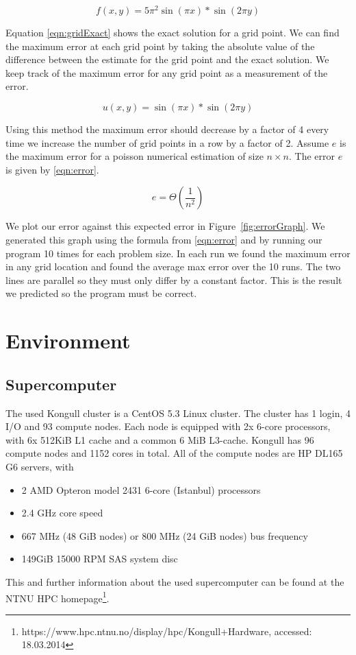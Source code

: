 \documentclass{article}
\begin{document}
	\begin{equation}
		\label{eqn:gridInitial}
		f(x,y) = 5\pi^2 \sin(\pi x)* \sin(2\pi y)
	\end{equation}

	Equation \ref{eqn:gridExact} shows the exact solution for a grid point. We can find the maximum error at each grid point by taking the absolute value of the difference between the estimate for the grid point and the exact solution. We keep track of the maximum error for any grid point as a measurement of the error.

	\begin{equation}
		\label{eqn:gridExact}
		u(x,y) = \sin(\pi x) * \sin(2 \pi y)
	\end{equation}

	Using this method the maximum error should decrease by a factor of 4 every time we increase the number of grid points in a row by a factor of 2. Assume $e$ is the maximum error for a poisson numerical estimation of size $n \times n$. The error $e$ is given by \ref{eqn:error}.

	\begin{equation}
		\label{eqn:error}
		e = \Theta(\frac{1}{n^2})
	\end{equation}

	We plot our error against this expected error in Figure~\ref{fig:errorGraph}. We generated this graph using the formula from \ref{eqn:error} and by running our program 10 times for each problem size. In each run we found the maximum error in any grid location and found the average max error over the 10 runs. The two lines are parallel so they must only differ by a constant factor. This is the result we predicted so the program must be correct.

\section{Environment}
\subsection{Supercomputer}
The used Kongull cluster is a CentOS 5.3 Linux cluster. The cluster has 1 login, 4 I/O and 93 compute nodes. Each node is equipped with 2x 6-core processors, with 6x 512KiB L1 cache and a common 6 MiB L3-cache. Kongull has 96 compute nodes and 1152 cores in total. All of the compute nodes are HP DL165 G6 servers, with
\begin{itemize}
\item 2 AMD Opteron model 2431 6-core (Istanbul) processors
\item 2.4 GHz core speed
\item 667 MHz (48 GiB nodes) or 800 MHz (24 GiB nodes) bus frequency
\item 149GiB 15000 RPM SAS system disc
\end{itemize}
This and further information about the used supercomputer can be found at the NTNU HPC homepage\footnote{https://www.hpc.ntnu.no/display/hpc/Kongull+Hardware, accessed: 18.03.2014}.
\end{document}

